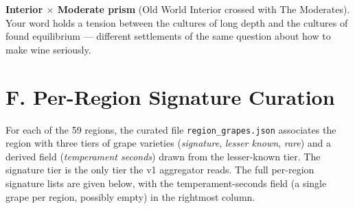 \documentclass[11pt]{article}
\begin{document}
\textbf{Interior $\times$ Moderate prism} (Old World Interior crossed with The Moderates). Your word holds a tension between the cultures of long depth and the cultures of found equilibrium --- different settlements of the same question about how to make wine seriously.

\section*{F. Per-Region Signature Curation}

For each of the 59 regions, the curated file \texttt{region\_grapes.json} associates the region with three tiers of grape varieties (\emph{signature}, \emph{lesser known}, \emph{rare}) and a derived field (\emph{temperament seconds}) drawn from the lesser-known tier. The signature tier is the only tier the v1 aggregator reads. The full per-region signature lists are given below, with the temperament-seconds field (a single grape per region, possibly empty) in the rightmost column.
\end{document}
